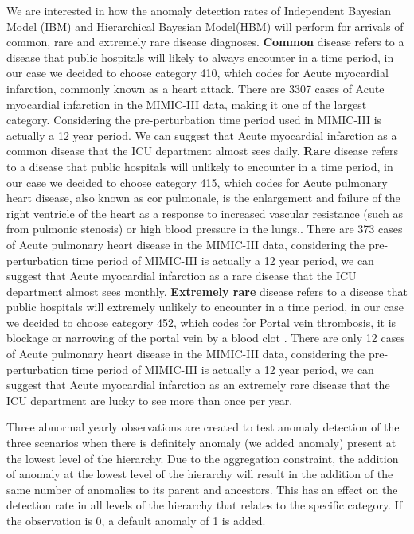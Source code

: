 We are interested in how the anomaly detection rates of Independent Bayesian Model (IBM) and Hierarchical Bayesian Model(HBM) will perform for arrivals of common, rare and extremely rare disease diagnoses. \textbf{Common} disease refers to a disease that public hospitals will likely to always encounter in a time period, in our case we decided to choose category 410, which codes for Acute myocardial infarction, commonly known as a heart attack. There are 3307 cases of Acute myocardial infarction in the MIMIC-III data, making it one of the largest category. Considering the pre-perturbation time period used in MIMIC-III is actually a 12 year period. We can suggest that Acute myocardial infarction as a common disease that the ICU department almost sees daily. \textbf{Rare} disease refers to a disease that public hospitals will unlikely to encounter in a time period, in our case we decided to choose category 415, which codes for Acute pulmonary heart disease, also known as cor pulmonale, is the enlargement and failure of the right ventricle of the heart as a response to increased vascular resistance (such as from pulmonic stenosis) or high blood pressure in the lungs.\citep{MedlinePlus2019}. There are 373 cases of Acute pulmonary heart disease in the MIMIC-III data,  considering the pre-perturbation time period of MIMIC-III is actually a 12 year period, we can suggest that Acute myocardial infarction as a rare disease that the ICU department almost sees monthly. \textbf{Extremely rare} disease refers to a disease that public hospitals will extremely unlikely to encounter in a time period, in our case we decided to choose category 452, which codes for Portal vein thrombosis, it is blockage or narrowing of the portal vein by a blood clot \citep{MSD2019}. There are only 12 cases of Acute pulmonary heart disease in the MIMIC-III data,  considering the pre-perturbation time period of MIMIC-III is actually a 12 year period, we can suggest that Acute myocardial infarction as an extremely rare disease that the ICU department are lucky to see more than once per year. 

\newpara

Three abnormal yearly observations are created to test anomaly detection of the three scenarios when there is definitely anomaly (we added anomaly) present at the lowest level of the hierarchy. Due to the aggregation constraint, the addition of anomaly at the lowest level of the hierarchy will result in the addition of the same number of anomalies to its parent and ancestors. This has an effect on the detection rate in all levels of the hierarchy that relates to the specific category. If the observation is 0, a default anomaly of 1 is added. 

